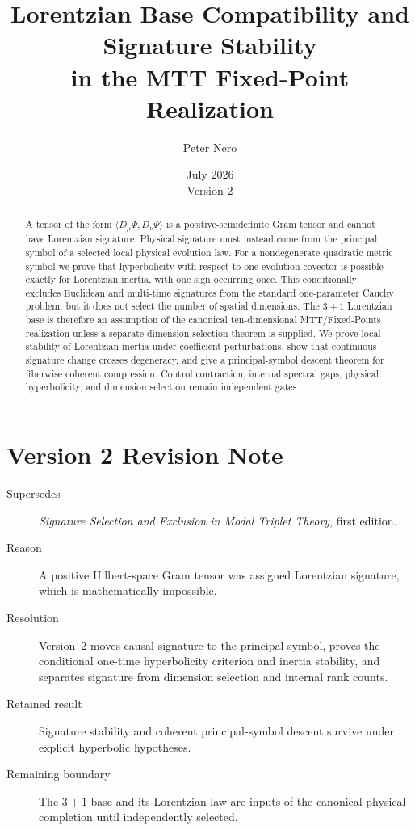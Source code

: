 \documentclass[11pt]{article}
\title{Lorentzian Base Compatibility and Signature Stability\\
\large in the MTT Fixed-Point Realization}
\author{Peter Nero}
\date{July 2026\\Version 2}
\begin{document}
\maketitle
\seriestagline

\begin{abstract}
A tensor of the form
$\langle D_\mu\Psi,D_\nu\Psi\rangle$ is a positive-semidefinite Gram
tensor and cannot have Lorentzian signature. Physical signature must instead
come from the principal symbol of a selected local physical evolution law.
For a nondegenerate quadratic metric symbol we prove that hyperbolicity with
respect to one evolution covector is possible exactly for Lorentzian inertia,
with one sign occurring once. This conditionally excludes Euclidean and
multi-time signatures from the standard one-parameter Cauchy problem, but it
does not select the number of spatial dimensions. The $3+1$ Lorentzian base is
therefore an assumption of the canonical ten-dimensional MTT/Fixed-Points
realization unless a separate dimension-selection theorem is supplied. We
prove local stability of Lorentzian inertia under coefficient perturbations,
show that continuous signature change crosses degeneracy, and give a
principal-symbol descent theorem for fiberwise coherent compression. Control
contraction, internal spectral gaps, physical hyperbolicity, and dimension
selection remain independent gates.
\end{abstract}

\section*{Version 2 Revision Note}
\begin{description}
\item[Supersedes] \emph{Signature Selection and Exclusion in Modal Triplet
Theory}, first edition.
\item[Reason] A positive Hilbert-space Gram tensor was assigned Lorentzian
signature, which is mathematically impossible.
\item[Resolution] Version~2 moves causal signature to the principal symbol,
proves the conditional one-time hyperbolicity criterion and inertia stability,
and separates signature from dimension selection and internal rank counts.
\item[Retained result] Signature stability and coherent principal-symbol
descent survive under explicit hyperbolic hypotheses.
\item[Remaining boundary] The $3+1$ base and its Lorentzian law are inputs of
the canonical physical completion until independently selected.
\end{description}
\end{document}
